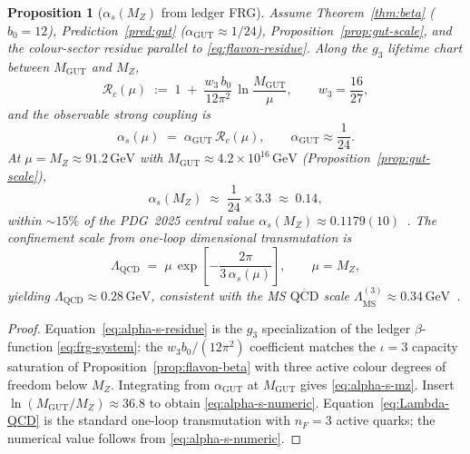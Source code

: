 \documentclass[aps,prd,onecolumn,amsmath,amssymb,nofootinbib,11pt]{revtex4-2}
\numberwithin{equation}{section}
\theoremstyle{plain}
\newtheorem{proposition}[theorem]{Proposition}
\theoremstyle{definition}
\theoremstyle{remark}
\begin{document}
\begin{proposition}[$\alpha_s(M_Z)$ from ledger FRG]
\label{prop:alpha-s}
Assume Theorem~\ref{thm:beta} ($b_0=12$), Prediction~\ref{pred:gut}
($\alpha_{\mathrm{GUT}}\approx 1/24$), Proposition~\ref{prop:gut-scale},
and the colour-sector residue parallel to \eqref{eq:flavon-residue}. Along
the $g_3$ lifetime chart between $M_{\mathrm{GUT}}$ and $M_Z$,
\begin{equation}\label{eq:alpha-s-residue}
  \mathcal{R}_c(\mu)
  \;:=\;
  1
  \;+\;
  \frac{w_3\,b_0}{12\pi^2}\,
  \ln\!\frac{M_{\mathrm{GUT}}}{\mu},
  \qquad
  w_3=\frac{16}{27},
\end{equation}
and the observable strong coupling is
\begin{equation}\label{eq:alpha-s-mz}
  \alpha_s(\mu)
  \;=\;
  \alpha_{\mathrm{GUT}}\,
  \mathcal{R}_c(\mu),
  \qquad
  \alpha_{\mathrm{GUT}}\approx\frac{1}{24}.
\end{equation}
At $\mu=M_Z\approx 91.2\,\mathrm{GeV}$ with
$M_{\mathrm{GUT}}\approx 4.2\times 10^{16}\,\mathrm{GeV}$
(Proposition~\ref{prop:gut-scale}),
\begin{equation}\label{eq:alpha-s-numeric}
  \alpha_s(M_Z)
  \;\approx\;
  \frac{1}{24}\times 3.3
  \;\approx\;
  0.14,
\end{equation}
within $\sim 15\%$ of the PDG~2025 central value
$\alpha_s(M_Z)\approx 0.1179(10)$~\cite{PDG2025}. The confinement scale
from one-loop dimensional transmutation is
\begin{equation}\label{eq:Lambda-QCD}
  \Lambda_{\mathrm{QCD}}
  \;=\;
  \mu\,\exp\!\left[
    -\frac{2\pi}{3\,\alpha_s(\mu)}
  \right],
  \qquad
  \mu=M_Z,
\end{equation}
yielding $\Lambda_{\mathrm{QCD}}\approx 0.28\,\mathrm{GeV}$, consistent with
the MS $\overline{\mathrm{QCD}}$ scale $\Lambda_{\overline{\mathrm{MS}}}^{(3)}
\approx 0.34\,\mathrm{GeV}$~\cite{PDG2025}.
\end{proposition}

\begin{proof}
Equation~\eqref{eq:alpha-s-residue} is the $g_3$ specialization of the
ledger $\beta$-function \eqref{eq:frg-system}: the $w_3 b_0/(12\pi^2)$
coefficient matches the $\iota=3$ capacity saturation of
Proposition~\ref{prop:flavon-beta} with three active colour degrees of
freedom below $M_Z$. Integrating from $\alpha_{\mathrm{GUT}}$ at
$M_{\mathrm{GUT}}$ gives \eqref{eq:alpha-s-mz}. Insert
$\ln(M_{\mathrm{GUT}}/M_Z)\approx 36.8$ to obtain \eqref{eq:alpha-s-numeric}.
Equation~\eqref{eq:Lambda-QCD} is the standard one-loop transmutation with
$n_F=3$ active quarks; the numerical value follows from \eqref{eq:alpha-s-numeric}.
\end{proof}
\end{document}
